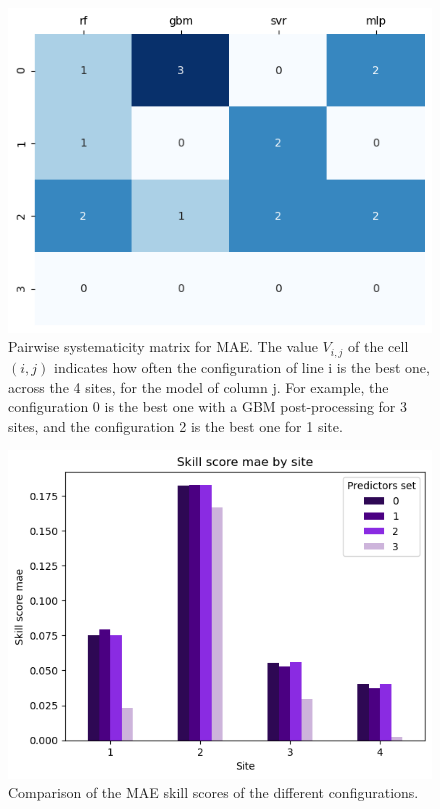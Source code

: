 \begin{figure}[htb!]
    \centering
    \includegraphics[width=\columnwidth]{figures/first_study/comp_predictors_mae.png}
\caption{Pairwise systematicity matrix for MAE. The value $V_{i,j}$ of the cell $(i,j)$ indicates how often the configuration of line i is the best one, across the 4 sites, for the model of column j. For example, the configuration 0 is the best one with a GBM post-processing for 3 sites, and the configuration 2 is the best one for 1 site.}
\label{fig:matrix_pred}
\end{figure}

\begin{figure}[htb!]
    \centering
    \includegraphics[width=\columnwidth]{figures/first_study/comp_predictors_mae_svr.png}
\caption{Comparison of the MAE skill scores of the different configurations.}
    \label{fig:ss_pred}
\end{figure}

